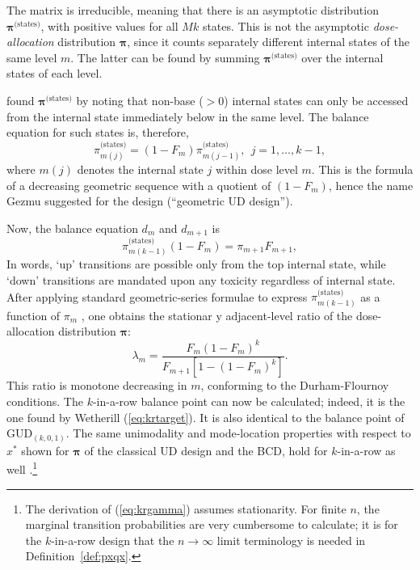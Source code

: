 The matrix is irreducible, meaning that there is an asymptotic distribution $\boldsymbol{\pi}^{\textrm{(states)}}$, with positive values for all $Mk$ states. This is not the asymptotic \emph{dose-allocation} distribution $\boldsymbol{\pi}$, since it counts separately different internal states of the same level $m$. The latter can be found by summing $\boldsymbol{\pi}^{\textrm{(states)}}$ over the internal states of each level.

\cite{Gezm:Geom:1996} found  $\boldsymbol{\pi}^{\textrm{(states)}}$ by noting that non-base ($>0$) internal states can only be accessed from the internal state immediately below in the same level. The balance equation for such states is, therefore,
%
\begin{equation}\label{eq:kinternal}
\pi^{\textrm{(states)}}_{m(j)}=\left(1-F_m\right)\pi^{\textrm{(states)}}_{m(j-1)},\ \ j=1,\ldots,k-1,
\end{equation}
\noindent where $m(j)$ denotes the internal state $j$ within dose level $m$. This is the formula of a decreasing geometric sequence with a quotient of $\left(1-F_m\right)$, hence the name Gezmu suggested for the design (``geometric UD design'').

Now, the balance equation $d_m$ and $d_{m+1}$ is
%
\begin{equation}\label{eq:kexternal}
\pi^{\textrm{(states)}}_{m(k-1)}\left(1-F_m\right)=\pi_{m+1}F_{m+1},
\end{equation}
%
\noindent In words, `up' transitions are possible only from the top internal state, while `down' transitions are mandated upon any toxicity regardless of internal state. After applying standard geometric-series formulae to express $\pi^{\textrm{(states)}}_{m(k-1)}$ as a function of $\pi_m$ , one obtains the stationar y adjacent-level ratio of the dose-allocation distribution $\boldsymbol{\pi}$:
%
\begin{equation}\label{eq:krgamma}
\lambda_m=\frac{F_m\left(1-F_m\right)^{k}}{F_{m+1}\left[1-\left(1-F_m\right)^{k}\right]}.
\end{equation}
%
This ratio is monotone decreasing in $m$, conforming to the Durham-Flournoy conditions. The $k$-in-a-row balance point can now be calculated; indeed, it is the one found by Wetherill (\ref{eq:krtarget}). It is also identical to the balance point of GUD$_{(k,0,1)}$. The same unimodality and mode-location properties with respect to $x^*$ shown for $\boldsymbol{\pi}$ of the classical UD design and the BCD, hold for $k$-in-a-row as well \citep{Oron:Hoff:thek:2009}.\footnote{The derivation of (\ref{eq:krgamma}) assumes stationarity. For finite $n$, the marginal transition probabilities are very cumbersome to calculate; it is for the $k$-in-a-row design that the $n\to\infty$ limit terminology is needed in Definition~\ref{def:pxqx}.}

